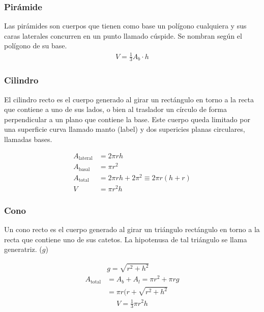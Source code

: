 \subsubsection{Pirámide}
Las pirámides son cuerpos que tienen como base un polígono cualquiera y sus caras laterales concurren en un punto llamado cúspide. Se nombran según el polígono de su base.\\
\begin{equation*}
    \begin{aligned} 
    V = \frac{1}{3}A_b\cdot h
    \end{aligned}
\end{equation*}
\subsubsection{Cilindro}
El cilindro recto es el cuerpo generado al girar un rectángulo en torno a la recta que contiene a uno de sus lados, o bien al traslador un círculo de forma perpendicular a un plano que contiene la base. Este cuerpo queda limitado por una superficie curva llamado manto (label) y dos supericies planas circulares, llamadas bases.

\begin{equation*}
    \begin{split} 
    A_{\text{lateral}} &= 2\pi rh\\
    A_{\text{basal}} &= \pi r^2\\
    A_{\text{total}} &= 2\pi rh + 2\pi ^2 \equiv 2\pi r(h+r)\\
    V &= \pi r^2h
    \end{split}
\end{equation*}
\vfill\null\columnbreak
\subsubsection{Cono}
Un cono recto es el cuerpo generado al girar un triángulo rectángulo en torno a la recta que contiene uno de sus catetos. La hipotenusa de tal triángulo se llama generatriz. ($g$)

\begin{equation*}
    \begin{split} 
        &g = \sqrt{r^2 + h^2}\\
        A_{\text{total}} &= A_b + A_l = \pi r^2 + \pi rg \\
        &= \pi r(r + \sqrt{r^2 + h^2}
    \end{split}
\end{equation*}
\begin{equation*}
    \begin{aligned} 
        V = \frac{1}{3}\pi r^2h
    \end{aligned}
\end{equation*}

